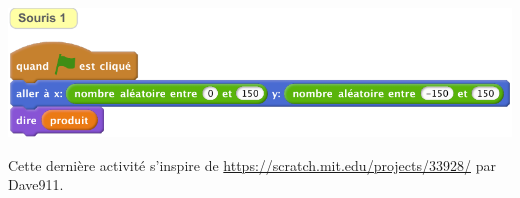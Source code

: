 \documentclass[class=report,crop=false, 12pt]{standalone}
\begin{document}
\begin{code}
{\includegraphics[scale=\scalesolution,scale=0.7]{code-08-ex2b} 
}

\medskip

Cette dernière activité s'inspire de \href{https://scratch.mit.edu/projects/33928/}{https://scratch.mit.edu/projects/33928/} par Dave911.
\end{code}
\fi
\end{document}
